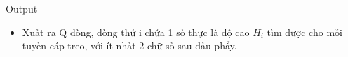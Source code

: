Output
\begin{itemize}
	\item     Xuất ra Q dòng, dòng thứ i chứa 1 số thực là độ cao    \textbf{     $H_{i}$}    tìm được cho mỗi tuyến cáp treo, với ít nhất 2 chữ số sau dấu phẩy.   
\end{itemize}